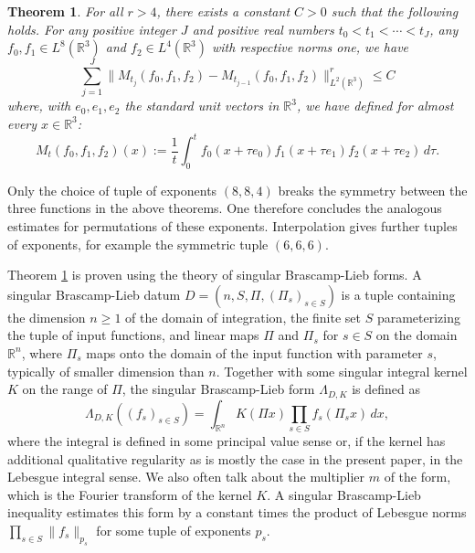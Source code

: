 \documentclass[12pt,reqno]{amsart}
\theoremstyle{plain}
\newtheorem{theorem}{Theorem}[section]
\theoremstyle{definition}
\numberwithin{equation}{section}
\newcommand{\R}{{\mathbb R}}
\begin{document}
\begin{theorem}\label{thm:2}
For all $r>4$, there exists a  constant $C>0$ such that the following holds. For any positive integer $J$ and positive real numbers $t_0<t_1<\cdots < t_J$,  any $f_0,f_1\in L^8(\R^3)$  and $f_2\in {L}^4(\mathbb{R}^3)$ with respective norms one, we have 
\begin{equation}\label{e:main2} \sum_{j=1}^{J} \|M_{t_j}(f_0,f_1,f_2) - M_{t_{j-1}}(f_0,f_1,f_2)\|_{{L}^2(\R^3)}^r \leq C 
\end{equation}
where, with $e_0,e_1,e_2$ the standard unit vectors in $\R^3$, we have defined for almost every $x\in \R^3$:
\begin{equation}\label{eq:averages}
M_{t}(f_0,f_1,f_2)(x) := \frac{1}{t}\int_0^t f_0(x+\tau e_0) f_1(x+\tau e_1) f_2(x+\tau e_2)\,d\tau.
\end{equation}
\end{theorem}


Only the choice of tuple of exponents $(8,8,4)$ breaks the symmetry between the three functions in the above theorems. One therefore concludes the analogous estimates for permutations of these exponents. Interpolation gives further
tuples of exponents, for example the symmetric tuple $(6,6,6)$.



Theorem \ref{thm:2} is proven 
using
the theory of singular Brascamp-Lieb forms. 
A singular Brascamp-Lieb datum $D=(n,S,\Pi,(\Pi_s)_{s\in S})$ is a tuple containing the dimension $n\ge 1$ of the domain of integration, the finite set $S$ parameterizing the tuple of input functions,
and linear maps $\Pi$ and $\Pi_s$ for $s\in S$ on the domain $\R^{n}$,
where $\Pi_s$ maps onto the domain of the input function with parameter $s$, typically of smaller dimension than $n$. Together with some singular integral kernel $K$
on the range of $\Pi$, the singular Brascamp-Lieb 
form $\Lambda_{D,K}$ is defined as
\[\Lambda_{D,K}((f_s)_{s\in S})=\int_{\R^n} K(\Pi x)\prod_{s\in S} f_s(\Pi_sx)\, dx ,\]
where the integral is defined in some principal value sense or, if the kernel has additional qualitative regularity as is mostly the case in the present paper, in the Lebesgue integral sense. We also often talk about the multiplier $m$ of the form,
which is the Fourier transform of the kernel $K$. A singular Brascamp-Lieb inequality estimates this form by a constant times
the product of Lebesgue norms $\prod_{s\in S} \|f_s\|_{p_s}$ for some tuple of
exponents $p_s$. 
\end{document}
